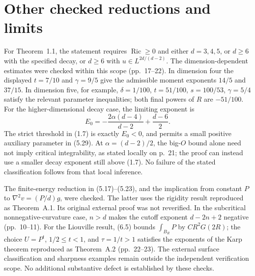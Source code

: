 \documentclass[10pt]{article}
\begin{document}
\section*{Other checked reductions and limits}
For Theorem 1.1, the statement requires \(\mathop{\mathrm{Ric}}\ge0\) and either \(d=3,4,5\), or \(d\ge6\) with the specified decay, or \(d\ge6\) with \(u\in L^{2d/(d-2)}\). The dimension-dependent estimates were checked within this scope (pp. 17–22). In dimension four the displayed \(t=7/10\) and \(\gamma=9/5\) give the admissible moment exponents \(14/5\) and \(37/15\). In dimension five, for example, \(\delta=1/100\), \(t=51/100\), \(s=100/53\), \(\gamma=5/4\) satisfy the relevant parameter inequalities; both final powers of \(R\) are \(-51/100\). For the higher-dimensional decay case, the limiting exponent is \[E_0=-\frac{2\alpha(d-4)}{d-2}+\frac{d-6}{2}.\] The strict threshold in (1.7) is exactly \(E_0<0\), and permits a small positive auxiliary parameter in (5.29). At \(\alpha=(d-2)/2\), the big-\(O\) bound alone need not imply critical integrability, as stated locally on p. 21; the proof can instead use a smaller decay exponent still above (1.7). No failure of the stated classification follows from that local inference.\par
The finite-energy reduction in (5.17)–(5.23), and the implication from constant \(P\) to \(\nabla^2v=(P/d)g\), were checked. The latter uses the rigidity result reproduced as Theorem A.1. Its original external proof was not reverified. In the subcritical nonnegative-curvature case, \(n>d\) makes the cutoff exponent \(d-2n+2\) negative (pp. 10–11). For the Liouville result, (6.5) bounds \(\int_{B_R}P\) by \(CR^2G(2R)\); the choice \(U=P^t\), \(1/2\le t<1\), and \(\tau=1/t>1\) satisfies the exponents of the Karp theorem reproduced as Theorem A.2 (pp. 22–23). The external surface classification and sharpness examples remain outside the independent verification scope. No additional substantive defect is established by these checks.\par
\end{document}
